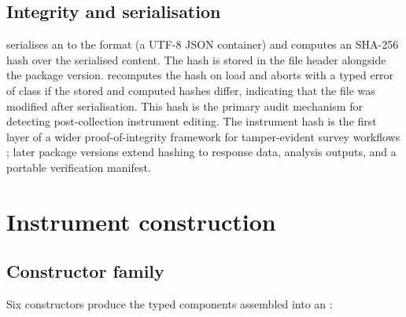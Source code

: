 \documentclass[article]{jss}\usepackage[]{graphicx}\usepackage[]{xcolor}
\begin{document}
\subsection{Integrity and serialisation}

 serialises an  to the
 format (a UTF-8 JSON container) and computes an
SHA-256 hash over the serialised content. The hash is stored in the
file header alongside the package version. 
recomputes the hash on load and aborts with a typed error of class
 if the stored and computed hashes differ,
indicating that the file was modified after serialisation. This
hash is the primary audit mechanism for detecting post-collection
instrument editing. The instrument hash is the first layer of a wider
proof-of-integrity framework for tamper-evident survey workflows
\citep{sharafuddin2026ssr}; later package versions extend hashing to
response data, analysis outputs, and a portable verification manifest.

\section{Instrument construction}
\label{sec:construction}

\subsection{Constructor family}

Six constructors produce the typed components assembled into an
:
\end{document}
